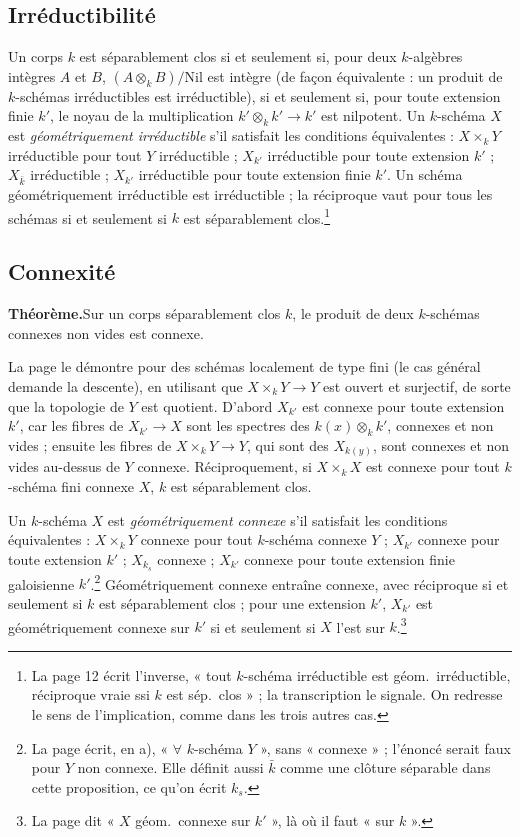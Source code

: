 \documentclass[11pt,a4paper]{article}
\begin{document}
\subsection*{Irréductibilité}

Un corps $k$ est séparablement clos si et seulement si, pour deux
$k$-algèbres intègres $A$ et $B$, $(A \otimes_{k} B)/\mathrm{Nil}$ est
intègre (de façon équivalente : un produit de $k$-schémas irréductibles est
irréductible), si et seulement si, pour toute extension finie $k'$, le noyau
de la multiplication $k' \otimes_{k} k' \to k'$ est nilpotent. Un $k$-schéma
$X$ est \emph{géométriquement irréductible} s'il satisfait les conditions
équivalentes : $X \times_{k} Y$ irréductible pour tout $Y$ irréductible ;
$X_{k'}$ irréductible pour toute extension $k'$ ; $X_{\bar k}$ irréductible ;
$X_{k'}$ irréductible pour toute extension finie $k'$. Un schéma
géométriquement irréductible est irréductible ; la réciproque vaut pour tous
les schémas si et seulement si $k$ est séparablement clos.\footnote{La page
12 écrit l'inverse, « tout $k$-schéma irréductible est géom.\ irréductible,
réciproque vraie ssi $k$ est sép.\ clos » ; la transcription le signale. On
redresse le sens de l'implication, comme dans les trois autres cas.}

\subsection*{Connexité}

\textbf{Théorème.}\quad Sur un corps séparablement clos $k$, le produit de deux $k$-schémas connexes
non vides est connexe.

La page le démontre pour des schémas localement de type fini (le cas général
demande la descente), en utilisant que $X \times_{k} Y \to Y$ est ouvert et
surjectif, de sorte que la topologie de $Y$ est quotient. D'abord $X_{k'}$
est connexe pour toute extension $k'$, car les fibres de $X_{k'} \to X$ sont
les spectres des $k(x) \otimes_{k} k'$, connexes et non vides ; ensuite les
fibres de $X \times_{k} Y \to Y$, qui sont des $X_{k(y)}$, sont connexes et
non vides au-dessus de $Y$ connexe. Réciproquement, si $X \times_{k} X$ est
connexe pour tout $k$-schéma fini connexe $X$, $k$ est séparablement clos.

Un $k$-schéma $X$ est \emph{géométriquement connexe} s'il satisfait les
conditions équivalentes : $X \times_{k} Y$ connexe pour tout $k$-schéma
connexe $Y$ ; $X_{k'}$ connexe pour toute extension $k'$ ; $X_{k_{s}}$
connexe ; $X_{k'}$ connexe pour toute extension finie galoisienne
$k'$.\footnote{La page écrit, en a), « $\forall$ $k$-schéma $Y$ », sans
« connexe » ; l'énoncé serait faux pour $Y$ non connexe. Elle définit aussi
$\bar k$ comme une clôture séparable dans cette proposition, ce qu'on écrit
$k_{s}$.}
Géométriquement connexe entraîne connexe, avec réciproque si et seulement si
$k$ est séparablement clos ; pour une extension $k'$, $X_{k'}$ est
géométriquement connexe sur $k'$ si et seulement si $X$ l'est sur
$k$.\footnote{La page dit « $X$ géom.\ connexe sur $k'$ », là où il faut
« sur $k$ ».}
\end{document}
